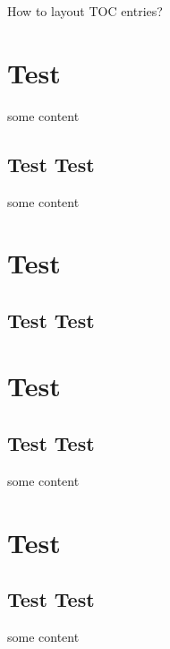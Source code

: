 \documentclass[aspectratio=169,hyperref={unicode},t]{beamer}
\begin{document}
\begin{frame}{How to layout TOC entries?}
\large
\tableofcontents[hideallsubsections]
\end{frame}

\section{Test}
    some content
\subsection{Test Test}
    some content
\section{Test}
\subsection{Test Test}
\section{Test}
\subsection{Test Test}
    some content
\section{Test}
\subsection{Test Test}
    some content
\end{document}
